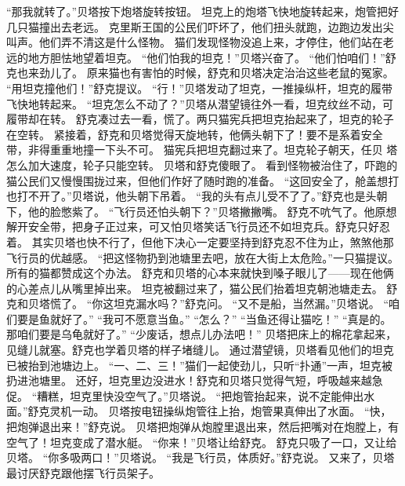 \documentclass[a4paper,12pt,UTF8,twoside]{ctexbook}
\begin{document}
        “那我就转了。”贝塔按下炮塔旋转按钮。 
        坦克上的炮塔飞快地旋转起来，炮管把好几只猫撞出去老远。 
        克里斯王国的公民们吓坏了，他们扭头就跑，边跑边发出尖叫声。他们弄不清这是什么怪物。 
        猫们发现怪物没追上来，才停住，他们站在老 远的地方胆怯地望着坦克。 
        “他们怕我的坦克！”贝塔兴奋了。 
        “他们怕咱们！”舒克也来劲儿了。 
        原来猫也有害怕的时候，舒克和贝塔决定治治这些老鼠的冤家。 
        “用坦克撞他们！”舒克提议。 
        “行！”贝塔发动了坦克，一推操纵杆，坦克的履带飞快地转起来。 
        “坦克怎么不动了？”贝塔从潜望镜往外一看，坦克纹丝不动，可履带却在转。 
        舒克凑过去一看，慌了。两只猫宪兵把坦克抬起来了，坦克的轮子在空转。 
        紧接着，舒克和贝塔觉得天旋地转，他俩头朝下了！要不是系着安全带，非得重重地撞一下头不可。 
        猫宪兵把坦克翻过来了。坦克轮子朝天，任贝 塔怎么加大速度，轮子只能空转。 
        贝塔和舒克傻眼了。 
        看到怪物被治住了，吓跑的猫公民们又慢慢围拢过来，但他们作好了随时跑的准备。 
        “这回安全了，舱盖想打也打不开了。”贝塔说，他头朝下吊着。 
        “我的头有点儿受不了了。”舒克也是头朝下，他的脸憋紫了。 
        “飞行员还怕头朝下？”贝塔撇撇嘴。 
        舒克不吭气了。他原想解开安全带，把身子正过来，可又怕贝塔笑话飞行员还不如坦克兵。舒克只好忍着。 
        其实贝塔也快不行了，但他下决心一定要坚持到舒克忍不住为止，煞煞他那飞行员的优越感。 
        “把这怪物扔到池塘里去吧，放在大街上太危险。”一只猫提议。 
        所有的猫都赞成这个办法。 
        舒克和贝塔的心本来就快到嗓子眼儿了——现在他俩的心差点儿从嘴里掉出来。 
        坦克被翻过来了，猫公民们抬着坦克朝池塘走去。 
        舒克和贝塔慌了。 
        “你这坦克漏水吗？”舒克问。 
        “又不是船，当然漏。”贝塔说。 
        “咱们要是鱼就好了。” 
        “我可不愿意当鱼。” 
        “怎么？” 
        “当鱼还得让猫吃！” 
        “真是的。那咱们要是乌龟就好了。” 
        “少废话，想点儿办法吧！” 
        贝塔把床上的棉花拿起来，见缝儿就塞。舒克也学着贝塔的样子堵缝儿。   
        通过潜望镜，贝塔看见他们的坦克已被抬到池塘边上。 
        “一、二、三！”猫们一起使劲儿，只听“扑通”一声，坦克被扔进池塘里。 
        还好，坦克里边没进水！舒克和贝塔只觉得气短，呼吸越来越急促。 
        “糟糕，坦克里快没空气了。”贝塔说。 
        “把炮管抬起来，说不定能伸出水面。”舒克灵机一动。 
        贝塔按电钮操纵炮管往上抬，炮管果真伸出了水面。 
        “快，把炮弹退出来！”舒克说。 
        贝塔把炮弹从炮膛里退出来，然后把嘴对在炮膛上，有空气了！坦克变成了潜水艇。 
        “你来！”贝塔让给舒克。 
        舒克只吸了一口，又让给贝塔。 
        “你多吸两口！”贝塔说。 
        “我是飞行员，体质好。”舒克说。 
        又来了，贝塔最讨厌舒克跟他摆飞行员架子。 
\end{document}
